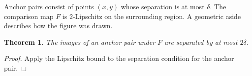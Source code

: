 \documentclass{article}
\newtheorem{theorem}{Theorem}
\begin{document}
Anchor pairs consist of points $(x,y)$ whose separation is at most $\delta$.
The comparison map $F$ is $2$-Lipschitz on the surrounding region.
A geometric aside describes how the figure was drawn.
\begin{theorem}\label{thm:anchor}
The images of an anchor pair under $F$ are separated by at most $2\delta$.
\end{theorem}
\begin{proof}
Apply the Lipschitz bound to the separation condition for the anchor pair.
\end{proof}
\end{document}
